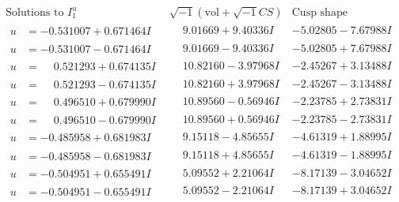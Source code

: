 \documentclass[1p]{elsarticle_modified}
\theoremstyle{definition}
\newcommand{\I}{\sqrt{-1}}
\begin{document}
$$\begin{array}{c|c|c}  
\text{Solutions to }I^u_{1}& \I (\text{vol} + \sqrt{-1}CS) & \text{Cusp shape}\\
 \hline 
\begin{aligned}
u &= -0.531007 + 0.671464 I\end{aligned}
 & \phantom{-}9.01669 + 9.40336 I & -5.02805 - 7.67988 I \\ \hline\begin{aligned}
u &= -0.531007 - 0.671464 I\end{aligned}
 & \phantom{-}9.01669 - 9.40336 I & -5.02805 + 7.67988 I \\ \hline\begin{aligned}
u &= \phantom{-}0.521293 + 0.674135 I\end{aligned}
 & \phantom{-}10.82160 - 3.97968 I & -2.45267 + 3.13488 I \\ \hline\begin{aligned}
u &= \phantom{-}0.521293 - 0.674135 I\end{aligned}
 & \phantom{-}10.82160 + 3.97968 I & -2.45267 - 3.13488 I \\ \hline\begin{aligned}
u &= \phantom{-}0.496510 + 0.679990 I\end{aligned}
 & \phantom{-}10.89560 - 0.56946 I & -2.23785 + 2.73831 I \\ \hline\begin{aligned}
u &= \phantom{-}0.496510 - 0.679990 I\end{aligned}
 & \phantom{-}10.89560 + 0.56946 I & -2.23785 - 2.73831 I \\ \hline\begin{aligned}
u &= -0.485958 + 0.681983 I\end{aligned}
 & \phantom{-}9.15118 - 4.85655 I & -4.61319 + 1.88995 I \\ \hline\begin{aligned}
u &= -0.485958 - 0.681983 I\end{aligned}
 & \phantom{-}9.15118 + 4.85655 I & -4.61319 - 1.88995 I \\ \hline\begin{aligned}
u &= -0.504951 + 0.655491 I\end{aligned}
 & \phantom{-}5.09552 + 2.21064 I & -8.17139 - 3.04652 I \\ \hline\begin{aligned}
u &= -0.504951 - 0.655491 I\end{aligned}
 & \phantom{-}5.09552 - 2.21064 I & -8.17139 + 3.04652 I \\ \hline\begin{aligned}

\end{aligned}
\end{array}$$
\end{document}
